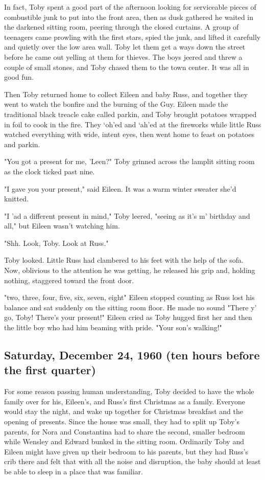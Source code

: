 In fact, Toby spent a good part of the afternoon looking for serviceable pieces of combustible junk to put into the front area, then as dusk gathered he waited in the darkened sitting room, peering through the closed curtains. A group of teenagers came prowling with the first stars, spied the junk, and lifted it carefully and quietly over the low area wall. Toby let them get a ways down the street before he came out yelling at them for thieves. The boys jeered and threw a couple of small stones, and Toby chased them to the town center. It was all in good fun.

Then Toby returned home to collect Eileen and baby Russ, and together they went to watch the bonfire and the burning of the Guy. Eileen made the traditional black treacle cake called parkin, and Toby brought potatoes wrapped in foil to cook in the fire. They `oh'ed and `ah'ed at the fireworks while little Russ watched everything with wide, intent eyes, then went home to feast on potatoes and parkin.

"You got a present for me, 'Leen?" Toby grinned across the lamplit sitting room as the clock ticked past nine.

"I gave you your present," said Eileen. It was a warm winter sweater she'd knitted.

"I 'ad a different present in mind," Toby leered, "seeing as it's m' birthday and all," but Eileen wasn't watching him.

"Shh. Look, Toby. Look at Russ."

Toby looked. Little Russ had clambered to his feet with the help of the sofa. Now, oblivious to the attention he was getting, he released his grip and, holding nothing, staggered toward the front door.

"{\el}two, three, four, five, six, seven, eight{\el}" Eileen stopped counting as Russ lost his balance and sat suddenly on the sitting room floor. He made no sound "There y' go, Toby! There's your present!" Eileen cried as Toby hugged first her and then the little boy who had him beaming with pride. "Your son's walking!"

\subsection{Saturday, December 24, 1960 (ten hours before the first quarter)}

For some reason passing human understanding, Toby decided to have the whole family over for his, Eileen's, and Russ's first Christmas as a family. Everyone would stay the night, and wake up together for Christmas breakfast and the opening of presents. Since the house was small, they had to split up Toby's parents, for Nora and Constantina had to share the second, smaller bedroom while Wensley and Edward bunked in the sitting room. Ordinarily Toby and Eileen might have given up their bedroom to his parents, but they had Russ's crib there and felt that with all the noise and disruption, the baby should at least be able to sleep in a place that was familiar.

